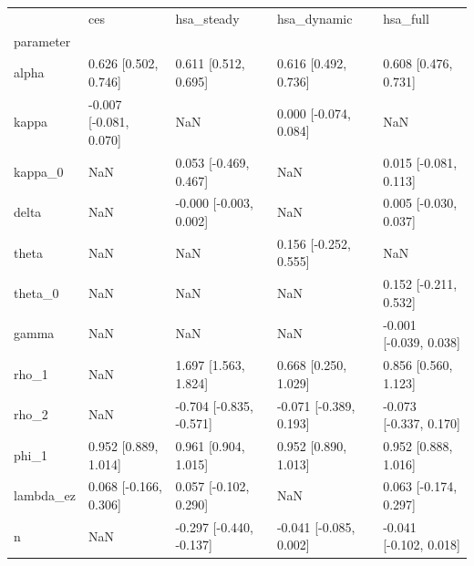 \begin{tabular}{lllll}
\toprule
 & ces & hsa\_steady & hsa\_dynamic & hsa\_full \\
parameter &  &  &  &  \\
\midrule
alpha & 0.626 [0.502, 0.746] & 0.611 [0.512, 0.695] & 0.616 [0.492, 0.736] & 0.608 [0.476, 0.731] \\
kappa & -0.007 [-0.081, 0.070] & NaN & 0.000 [-0.074, 0.084] & NaN \\
kappa\_0 & NaN & 0.053 [-0.469, 0.467] & NaN & 0.015 [-0.081, 0.113] \\
delta & NaN & -0.000 [-0.003, 0.002] & NaN & 0.005 [-0.030, 0.037] \\
theta & NaN & NaN & 0.156 [-0.252, 0.555] & NaN \\
theta\_0 & NaN & NaN & NaN & 0.152 [-0.211, 0.532] \\
gamma & NaN & NaN & NaN & -0.001 [-0.039, 0.038] \\
rho\_1 & NaN & 1.697 [1.563, 1.824] & 0.668 [0.250, 1.029] & 0.856 [0.560, 1.123] \\
rho\_2 & NaN & -0.704 [-0.835, -0.571] & -0.071 [-0.389, 0.193] & -0.073 [-0.337, 0.170] \\
phi\_1 & 0.952 [0.889, 1.014] & 0.961 [0.904, 1.015] & 0.952 [0.890, 1.013] & 0.952 [0.888, 1.016] \\
lambda\_ez & 0.068 [-0.166, 0.306] & 0.057 [-0.102, 0.290] & NaN & 0.063 [-0.174, 0.297] \\
n & NaN & -0.297 [-0.440, -0.137] & -0.041 [-0.085, 0.002] & -0.041 [-0.102, 0.018] \\
\bottomrule
\end{tabular}
